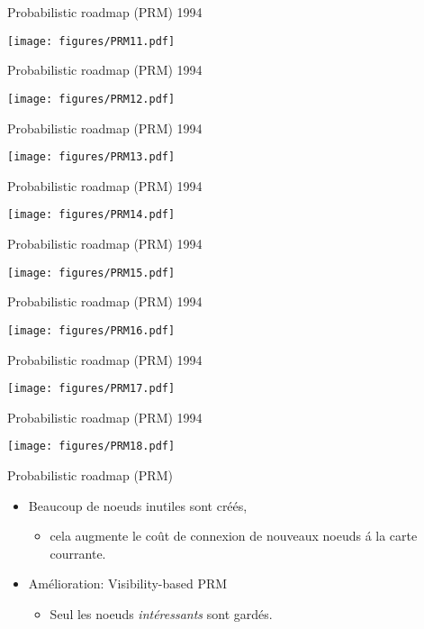 \begin{frame} {Probabilistic roadmap (PRM) 1994}
\centerline {
  \texttt{[image: figures/PRM11.pdf]}
}
\end{frame}

\begin{frame} {Probabilistic roadmap (PRM) 1994}
\centerline {
  \texttt{[image: figures/PRM12.pdf]}
}
\end{frame}

\begin{frame} {Probabilistic roadmap (PRM) 1994}
\centerline {
  \texttt{[image: figures/PRM13.pdf]}
}
\end{frame}

\begin{frame} {Probabilistic roadmap (PRM) 1994}
\centerline {
  \texttt{[image: figures/PRM14.pdf]}
}
\end{frame}

\begin{frame} {Probabilistic roadmap (PRM) 1994}
\centerline {
  \texttt{[image: figures/PRM15.pdf]}
}
\end{frame}

\begin{frame} {Probabilistic roadmap (PRM) 1994}
\centerline {
  \texttt{[image: figures/PRM16.pdf]}
}
\end{frame}

\begin{frame} {Probabilistic roadmap (PRM) 1994}
\centerline {
  \texttt{[image: figures/PRM17.pdf]}
}
\end{frame}

\begin{frame} {Probabilistic roadmap (PRM) 1994}
\centerline {
  \texttt{[image: figures/PRM18.pdf]}
}
\end{frame}

\begin{frame} {Probabilistic roadmap (PRM)}
  \begin{itemize}
  \item Beaucoup de noeuds inutiles sont cr\'e\'es,
    \begin{itemize}
    \item cela augmente le co\^ut de connexion de nouveaux noeuds \'a la carte courrante.
    \end{itemize}
  \item Am\'elioration: Visibility-based PRM
    \begin{itemize}
    \item Seul les noeuds \textit{int\'eressants} sont gard\'es.
    \end{itemize}
  \end{itemize}
\end{frame}


